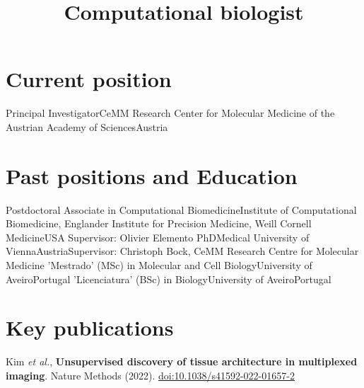 \documentclass[11pt,a4paper,roman]{moderncv} %
\title{Computational biologist}
\begin{document}
\makecvtitle %


\section{Current position}
    {Principal Investigator}{CeMM Research Center for Molecular Medicine of the Austrian Academy of Sciences}{Austria}
    {}{}


\section{Past positions and Education}
        {Postdoctoral Associate in Computational Biomedicine}{Institute of Computational Biomedicine, Englander Institute for Precision Medicine, Weill Cornell Medicine}{USA}
        {}{Supervisor: Olivier Elemento}
        {PhD}{Medical University of Vienna}{Austria}{}{Supervisor: Christoph Bock, CeMM Research Centre for Molecular Medicine}
        {'Mestrado' (MSc) in Molecular and Cell Biology}{University of Aveiro}{Portugal}{}{}
        {'Licenciatura' (BSc) in Biology}{University of Aveiro}{Portugal}{}{}




\section{Key publications}
    \cvitem{}
        {Kim \textit{et al.}, \textbf{Unsupervised discovery of tissue architecture in multiplexed imaging}. Nature Methods (2022). \href{https://doi.org/10.1038/s41592-022-01657-2}{doi:10.1038/s41592-022-01657-2}}
\end{document}

